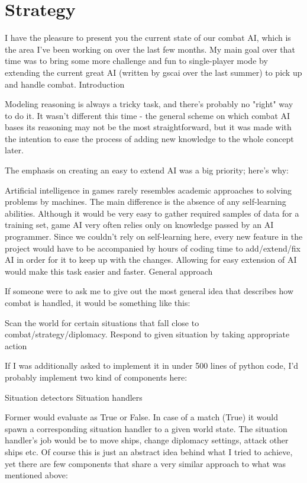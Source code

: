 \chapter{Strategy}

I have the pleasure to present you the current state of our combat AI, which is the area I've been working on over the last few months. 
My main goal over that time was to bring some more challenge and fun to single-player mode by extending the current great AI (written by gscai over the last summer) to pick up and handle combat.
Introduction

Modeling reasoning is always a tricky task, and there's probably no "right" way to do it. 
It wasn't different this time - the general scheme on which combat AI bases its reasoning may not be the most straightforward, but it was made with the intention to ease the process of adding new knowledge to the whole concept later.

The emphasis on creating an easy to extend AI was a big priority; here's why:

Artificial intelligence in games rarely resembles academic approaches to solving problems by machines. 
The main difference is the absence of any self-learning abilities. 
Although it would be very easy to gather required samples of data for a training set, game AI very often relies only on knowledge passed by an AI programmer. 
Since we couldn't rely on self-learning here, every new feature in the project would have to be accompanied by hours of coding time to add/extend/fix AI in order for it to keep up with the changes. 
Allowing for easy extension of AI would make this task easier and faster.
General approach

If someone were to ask me to give out the most general idea that describes how combat is handled, it would be something like this:

    Scan the world for certain situations that fall close to combat/strategy/diplomacy.
    Respond to given situation by taking appropriate action

If I was additionally asked to implement it in under 500 lines of python code, I'd probably implement two kind of components here:

    Situation detectors
    Situation handlers

Former would evaluate as True or False. 
In case of a match (True) it would spawn a corresponding situation handler to a given world state. 
The situation handler's job would be to move ships, change diplomacy settings, attack other ships etc. 
Of course this is just an abstract idea behind what I tried to achieve, yet there are few components that share a very similar approach to what was mentioned above:


